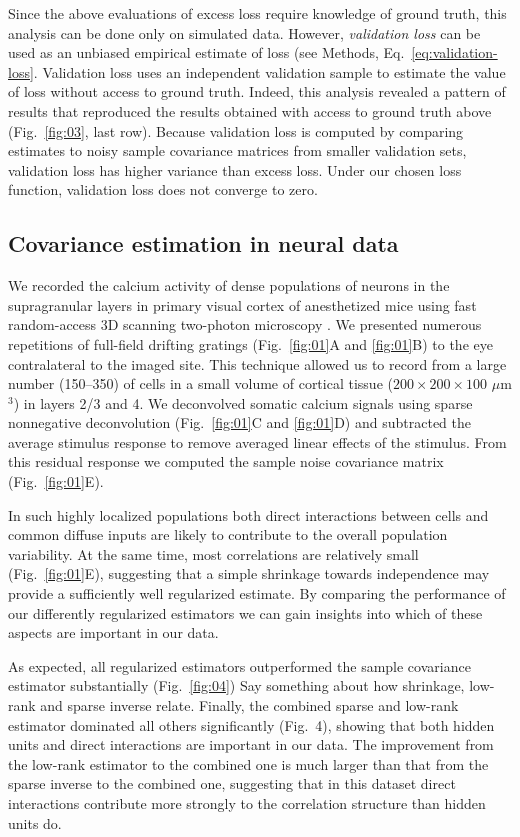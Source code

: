 \documentclass[10pt]{article}
\begin{document}
Since the above evaluations of excess loss require knowledge of ground truth, this analysis can be done only on simulated data. However, \emph{validation loss} can be used as an unbiased empirical estimate of loss  (see Methods, Eq.~\ref{eq:validation-loss}. Validation loss uses an independent validation sample to estimate the value of loss without access to ground truth.   Indeed, this analysis revealed a pattern of results that reproduced the results obtained with access to ground truth above (Fig.~\ref{fig:03}, last row). Because validation loss is computed by comparing estimates to noisy sample covariance matrices from smaller validation sets, validation loss has higher variance than excess loss. Under our chosen loss function, validation loss does not converge to zero. 

\subsection*{Covariance estimation in neural data}

We recorded the calcium activity of dense populations of neurons in the supragranular layers in primary visual cortex of anesthetized mice using fast random-access 3D scanning two-photon microscopy \cite{Stosiek:2003,Reddy:2005}. We presented numerous repetitions of full-field drifting gratings (Fig.~\ref{fig:01}A and \ref{fig:01}B) to the eye contralateral to the imaged site. This technique allowed us to record from a large number (150--350) of cells in a small volume of cortical tissue ($200\times200\times100$ $\mu$m$^3$) in layers 2/3 and 4. We deconvolved somatic calcium signals using sparse nonnegative deconvolution \cite{Vogelstein:2010} (Fig.~\ref{fig:01}C and \ref{fig:01}D) and subtracted the average stimulus response to remove averaged linear effects of the stimulus. From this residual response we computed the sample noise covariance matrix (Fig.~\ref{fig:01}E).


In such highly localized populations both direct interactions between cells and common diffuse inputs are likely to contribute to the overall population variability. At the same time, most correlations are relatively small (Fig.~\ref{fig:01}E), suggesting that a simple shrinkage towards independence may provide a sufficiently well regularized estimate. By comparing the performance of our differently regularized estimators we can gain insights into which of these aspects are important in our data.

As expected, all regularized estimators outperformed the sample covariance estimator substantially (Fig.~\ref{fig:04}) Say something about how shrinkage, low-rank and sparse inverse relate. Finally, the combined sparse and low-rank estimator dominated all others significantly (Fig.~4), showing that both hidden units and direct interactions are important in our data. The improvement from the low-rank estimator to the combined one is much larger than that from the sparse inverse to the combined one, suggesting that in this dataset direct interactions contribute more strongly to the correlation structure than hidden units do.
\end{document}

